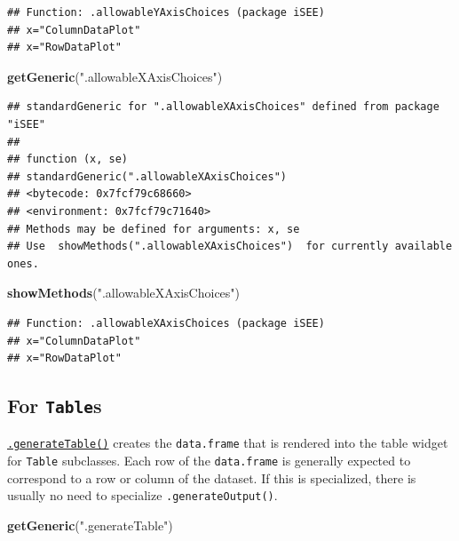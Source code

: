 \documentclass[
]{book}
\newenvironment{Shaded}{\begin{snugshade}}{\end{snugshade}}
\newcommand{\KeywordTok}[1]{\textcolor[rgb]{0.13,0.29,0.53}{\textbf{#1}}}
\newcommand{\NormalTok}[1]{#1}
\newcommand{\StringTok}[1]{\textcolor[rgb]{0.31,0.60,0.02}{#1}}
\begin{document}
\begin{verbatim}
## Function: .allowableYAxisChoices (package iSEE)
## x="ColumnDataPlot"
## x="RowDataPlot"
\end{verbatim}

\begin{Shaded}
\begin{Highlighting}[]
\KeywordTok{getGeneric}\NormalTok{(}\StringTok{".allowableXAxisChoices"}\NormalTok{)}
\end{Highlighting}
\end{Shaded}

\begin{verbatim}
## standardGeneric for ".allowableXAxisChoices" defined from package "iSEE"
## 
## function (x, se) 
## standardGeneric(".allowableXAxisChoices")
## <bytecode: 0x7fcf79c68660>
## <environment: 0x7fcf79c71640>
## Methods may be defined for arguments: x, se
## Use  showMethods(".allowableXAxisChoices")  for currently available ones.
\end{verbatim}

\begin{Shaded}
\begin{Highlighting}[]
\KeywordTok{showMethods}\NormalTok{(}\StringTok{".allowableXAxisChoices"}\NormalTok{)}
\end{Highlighting}
\end{Shaded}

\begin{verbatim}
## Function: .allowableXAxisChoices (package iSEE)
## x="ColumnDataPlot"
## x="RowDataPlot"
\end{verbatim}

\hypertarget{for-tables}{%
\subsection{\texorpdfstring{For \texttt{Table}s}{For Tables}}\label{for-tables}}

\href{https://isee.github.io/iSEE/reference/table-generics.html}{\texttt{.generateTable()}} creates the \texttt{data.frame} that is rendered into the table widget for \texttt{Table} subclasses.
Each row of the \texttt{data.frame} is generally expected to correspond to a row or column of the dataset.
If this is specialized, there is usually no need to specialize \texttt{.generateOutput()}.

\begin{Shaded}
\begin{Highlighting}[]
\KeywordTok{getGeneric}\NormalTok{(}\StringTok{".generateTable"}\NormalTok{)}
\end{Highlighting}
\end{Shaded}
\end{document}
